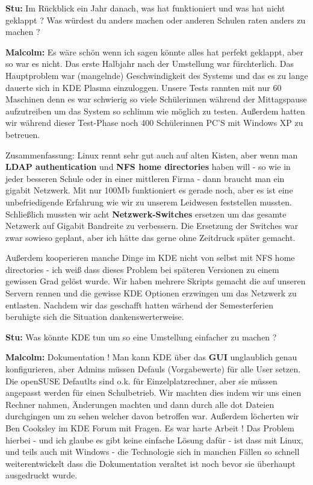 \textbf{Stu:} Im Rückblick ein Jahr danach, was hat funktioniert und was hat nicht geklappt ? Was würdest du anders machen oder anderen Schulen raten anders zu machen ?

\textbf{Malcolm:} Es wäre schön wenn ich sagen könnte alles hat perfekt geklappt, aber so war es nicht. Das erste Halbjahr nach der Umstellung war fürchterlich. Das Hauptproblem war (mangelnde) Geschwindigkeit des Systems und das es zu lange dauerte sich in KDE Plasma einzuloggen. Unsere Tests rannten mit nur 60 Maschinen denn es war schwierig so viele Schülerinnen während der Mittagspause aufzutreiben um das System so schlimm wie möglich zu testen. Außerdem hatten wir während dieser Test-Phase noch 400 Schülerinnen PC'S mit Windows XP zu betreuen.

Zusammenfassung: Linux rennt sehr gut auch auf alten Kisten, aber wenn man \textbf{LDAP authentication} und \textbf{NFS home directories} haben will - so wie in jeder besseren Schule oder in einer mittleren Firma - dann braucht man ein gigabit Netzwerk. Mit nur 100Mb funktioniert es gerade noch, aber es ist eine unbefriedigende Erfahrung wie wir zu unserem Leidwesen feststellen mussten. Schließlich mussten wir acht \textbf{Netzwerk-Switches} ersetzen um das gesamte Netzwerk auf Gigabit Bandreite zu verbessern. Die Ersetzung der Switches war zwar sowieso geplant, aber ich hätte das gerne ohne Zeitdruck später gemacht.

Außerdem kooperieren manche Dinge im KDE nicht von selbst mit NFS home directories - ich weiß dass dieses Problem bei späteren Versionen zu einem gewissen Grad gelöst wurde. Wir haben mehrere Skripts gemacht die auf unseren Servern rennen und die gewisse KDE Optionen erzwingen um das Netzwerk zu entlasten. Nachdem wir das geschafft hatten wärhend der Semesterferien beruhigte sich die Situation dankenswerterweise.

\textbf{Stu:} Was könnte KDE tun um so eine Umstellung einfacher zu machen ?

\textbf{Malcolm:} Dokumentation ! Man kann KDE über das \textbf{GUI} unglaublich genau konfigurieren, aber Admins müssen Defauls (Vorgabewerte) für alle User setzen. Die openSUSE Defautlts sind o.k. für Einzelplatzrechner, aber sie müssen angepasst werden für einen Schulbetrieb. Wir machten dies indem wir uns einen Rechner nahmen, Änderungen machten und dann durch alle dot Dateien durchgingen um zu sehen welcher davon betroffen war. Außerdem löcherten wir Ben Cooksley im KDE Forum mit Fragen. Es war harte Arbeit ! Das Problem hierbei - und ich glaube es gibt keine einfache Lösung dafür - ist dass mit Linux, und teils auch mit Windows - die Technologie sich in manchen Fällen so schnell weiterentwickelt dass die Dokumentation veraltet ist noch bevor sie überhaupt ausgedruckt wurde.
 
